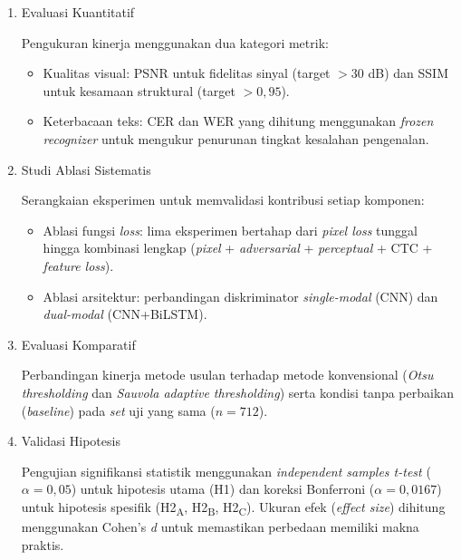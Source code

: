 \documentclass[12pt,a4paper]{article}
\begin{document}
\begin{enumerate}[label=\arabic*., leftmargin=1.5em, labelsep=0.5em, itemindent=0pt, noitemsep, topsep=0pt]
    \item Evaluasi Kuantitatif

    Pengukuran kinerja menggunakan dua kategori metrik:
    \begin{itemize}[nosep, leftmargin=1.5em]
        \item Kualitas visual: PSNR untuk fidelitas sinyal (target $>30$ dB) dan SSIM untuk kesamaan struktural (target $>0{,}95$).
        \item Keterbacaan teks: CER dan WER yang dihitung menggunakan \textit{frozen recognizer} untuk mengukur penurunan tingkat kesalahan pengenalan.
    \end{itemize}

    \item Studi Ablasi Sistematis
    
    Serangkaian eksperimen untuk memvalidasi kontribusi setiap komponen:
    \begin{itemize}[nosep, leftmargin=1.5em]
        \item Ablasi fungsi \textit{loss}: lima eksperimen bertahap dari \textit{pixel loss} tunggal hingga kombinasi lengkap (\textit{pixel} + \textit{adversarial} + \textit{perceptual} + CTC + \textit{feature loss}).
        \item Ablasi arsitektur: perbandingan diskriminator \textit{single-modal} (CNN) dan \textit{dual-modal} (CNN+BiLSTM).
    \end{itemize}

    \item Evaluasi Komparatif
    
    Perbandingan kinerja metode usulan terhadap metode konvensional (\textit{Otsu thresholding} dan \textit{Sauvola adaptive thresholding}) serta kondisi tanpa perbaikan (\textit{baseline}) pada \textit{set} uji yang sama ($n=712$).

    \item Validasi Hipotesis
    
    Pengujian signifikansi statistik menggunakan \textit{independent samples t-test} ($\alpha=0{,}05$) untuk hipotesis utama (H1) dan koreksi Bonferroni ($\alpha=0{,}0167$) untuk hipotesis spesifik (H2\textsubscript{A}, H2\textsubscript{B}, H2\textsubscript{C}). Ukuran efek (\textit{effect size}) dihitung menggunakan Cohen's \textit{d} untuk memastikan perbedaan memiliki makna praktis.
\end{enumerate}
\end{document}
